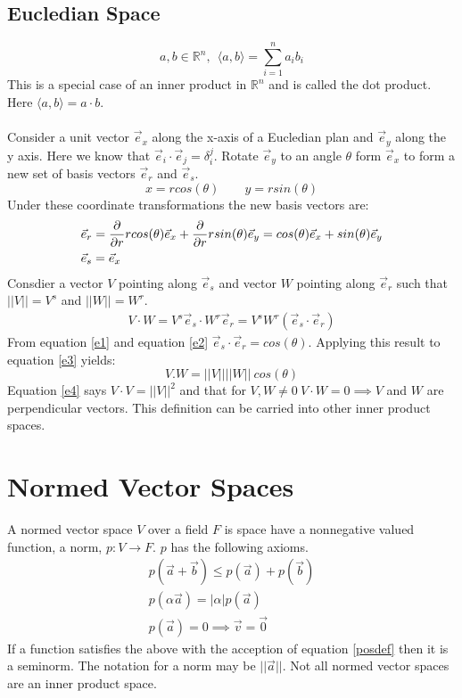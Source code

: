 \documentclass[a4paper]{article}
\newcommand{\norm}[1]{\lvert \lvert#1\rvert \rvert}
\newcommand{\inner}[1]{\langle #1 \rangle}
\begin{document}
\subsection{Eucledian Space}
\begin{equation}
  a,b \in \mathbb{R}^n, \: \: \inner{a,b} = \sum_{i=1}^n a_i b_i
\end{equation}
This is a special case of an inner product in $\mathbb{R}^n$ and is called the dot product. Here  $\inner{a,b} = a \cdot b$.
\\ \\
Consider a unit vector $\vec{e}_x$ along the x-axis of a Eucledian plan and $\vec{e}_y$ along the y axis. Here we know that $\vec{e}_i \cdot \vec{e}_j = \delta_i^j$. Rotate $\vec{e}_y$ to an angle $\theta$ form $\vec{e}_x$ to form a new set of basis vectors $\vec{e}_r$ and $\vec{e}_s$.
\begin{equation}
  x = r cos(\theta) \qquad y = r sin(\theta)
\end{equation}
Under these coordinate transformations the new basis vectors are:
\begin{align}
  &\vec{e}_r = \pdv{}{r} rcos(\theta) \vec{e}_x + \pdv{}{r} rsin(\theta) \vec{e}_y = cos(\theta)\vec{e}_x + sin(\theta)\vec{e}_y\label{e1}\\
  &\vec{e}_s = \vec{e}_x\label{e2}
\end{align}
Consdier a vector $V$ pointing along $\vec{e}_s$ and vector $W$ pointing along $\vec{e}_r$ such that $\norm{V} = V^s$ and $\norm{W}=W^r$.
\begin{align}
  V\cdot W = V^s \vec{e}_s \cdot W^r \vec{e}_r = V^s W^r (\vec{e}_s \cdot \vec{e}_r)\label{e3}
\end{align}
From equation \ref{e1} and equation \ref{e2} $\vec{e}_s \cdot \vec{e}_r = cos(\theta)$. Applying this result to equation \ref{e3} yields:
\begin{equation}
  \label{e4}
  V.W=\norm{V} \norm{W} \:cos({\theta})
\end{equation}
Equation \ref{e4} says $V \cdot V = \norm{V}^2$ and that for $V,W \ne 0 \: V\cdot W = 0 \implies V$ and $W$ are perpendicular vectors. This definition can be carried into other inner product spaces.
\section{Normed Vector Spaces}
A normed vector space $V$ over a field $F$ is space have a nonnegative valued function, a norm, $p:V \to F$. $p$ has the following axioms.
\begin{align}
  p(\vec{a}+\vec{b}) \le p(\vec{a})+p(\vec{b})\\
  p(\alpha \vec{a}) = \lvert \alpha \rvert p(\vec{a})\\
  p(\vec{a})=0 \implies \vec{v} = \vec{0}\label{posdef}
\end{align}
If a function satisfies the above with the acception of equation \ref{posdef} then it is a seminorm. The notation for a norm may be $\norm{\vec{a}}$. Not all normed vector spaces are an inner product space.
\end{document}
